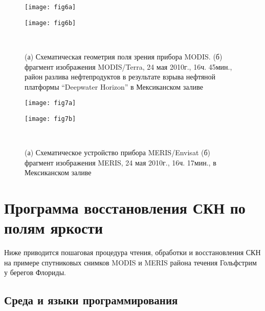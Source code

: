 \begin{figure}[H]
	\centering
	\begin{minipage}{.47\textwidth}
		\subcaptionbox{\label{fig:6a}}
	    {\texttt{[image: fig6a]}}
    \end{minipage}
    \hfill
    \begin{minipage}{.47\textwidth}
	    \subcaptionbox{\label{fig:6b}}
	    {\texttt{[image: fig6b]}}
    \end{minipage}
    \\
    \caption{(а) Схематическая геометрия поля зрения прибора MODIS. (б) фрагмент изображения MODIS/Terra, 24 мая 2010г., 16ч. 45мин., район разлива нефтепродуктов в результате взрыва нефтяной платформы ``Deepwater Horizon'' в Мексиканском заливе}
    \label{fig:6}

	\centering
	\begin{minipage}{.47\textwidth}
	    \subcaptionbox{\label{fig:7a}}
		{\texttt{[image: fig7a]}}
	\end{minipage}
	\hfill
	\begin{minipage}{.47\textwidth}
	    \subcaptionbox{\label{fig:7b}}
		{\texttt{[image: fig7b]}}
	\end{minipage}
	\\
    \caption{(а) Схематическое устройство прибора MERIS/Envisat (б) фрагмент изображения MERIS, 24 мая 2010г., 16ч. 17мин., в Мексиканском заливе}
    \label{fig:7}
\end{figure}



\newpage

\section{Программа восстановления СКН по полям яркости}

Ниже приводится пошаговая процедура чтения, обработки и восстановления СКН на примере спутниковых снимков MODIS и MERIS района течения Гольфстрим у берегов Флориды.



\subsection{Среда и языки программирования}


